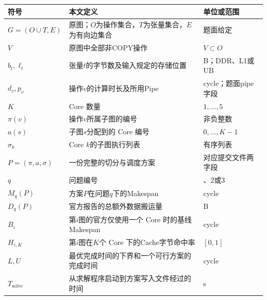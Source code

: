 \documentclass[anonymous,notoc]{gmcm2026}
\begin{document}
{\def\LTcaptype{table} %
\begin{longtable}[]{@{}
  >{\raggedright\arraybackslash}p{}
  >{\raggedright\arraybackslash}p{}
  >{\raggedright\arraybackslash}p{}@{}}
\toprule\noalign{}
\begin{minipage}[b]{\linewidth}\raggedright
符号
\end{minipage} & \begin{minipage}[b]{\linewidth}\raggedright
本文定义
\end{minipage} & \begin{minipage}[b]{\linewidth}\raggedright
单位或范围
\end{minipage} \\
\midrule\noalign{}
\endhead
\bottomrule\noalign{}
\endlastfoot
\(G=(O\cup T,E)\) & 原图；\(O\)为操作集合，\(T\)为张量集合，\(E\)为有向边集合 & 题面给定 \\
\(V\) & 原图中全部非COPY操作 & \(V\subset O\) \\
\(b_t,\ell_t\) & 张量\(t\)的字节数及输入规定的存储位置 & B；DDR、L1或UB \\
\(d_v,p_v\) & 操作\(v\)的计算时长及所用Pipe & cycle；题面pipe字段 \\
\(K\) & Core 数量 & \(1,\ldots,5\) \\
\(\pi(v)\) & 操作\(v\)所属子图的编号 & 非负整数 \\
\(a(s)\) & 子图\(s\)分配到的 Core 编号 & \(0,\ldots,K-1\) \\
\(\sigma_k\) & Core \(k\)的子图执行列表 & 有序列表 \\
\(P=(\pi,a,\sigma)\) & 一份完整的切分与调度方案 & 对应提交文件两字段 \\
\(q\) & 问题编号 & 1、2或3 \\
\(M_q(P)\) & 方案\(P\)在问题\(q\)下的Makespan & cycle \\
\(D_q(P)\) & 官方报告的总额外数据搬运量 & B \\
\(B_i\) & 第\(i\)图的官方仅使用一个 Core 时的基线Makespan & cycle \\
\(H_{i,K}\) & 第\(i\)图在\(K\)个 Core 下的Cache字节命中率 & \([0,1]\) \\
\(L,U\) & 最优完成时间的下界和一个可行方案的完成时间 & cycle \\
\(T_{\mathrm{solve}}\) & 从求解程序启动到方案写入文件经过的时间 & s \\
\end{longtable}
}
\end{document}
